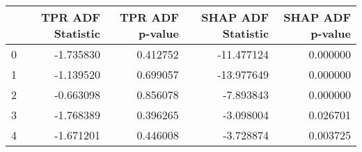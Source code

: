 \begin{tabular}{lrrrr}
\toprule
 & TPR ADF Statistic & TPR ADF p-value & SHAP ADF Statistic & SHAP ADF p-value \\
\midrule
0 & -1.735830 & 0.412752 & -11.477124 & 0.000000 \\
1 & -1.139520 & 0.699057 & -13.977649 & 0.000000 \\
2 & -0.663098 & 0.856078 & -7.893843 & 0.000000 \\
3 & -1.768389 & 0.396265 & -3.098004 & 0.026701 \\
4 & -1.671201 & 0.446008 & -3.728874 & 0.003725 \\
\bottomrule
\end{tabular}
